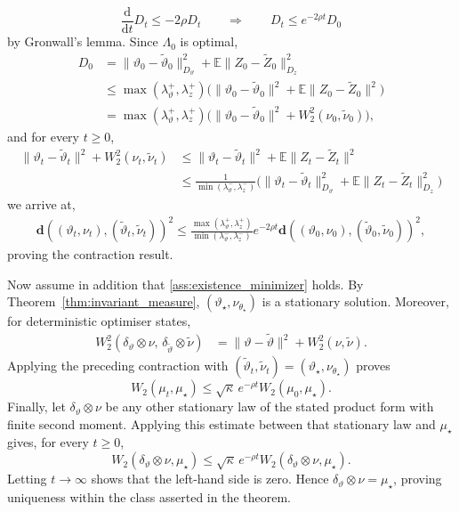 \[
    \frac{\mathrm d}{\mathrm dt}D_t
    \le
    -2\rho D_t\qquad\Rightarrow\qquad D_t\le e^{-2\rho t}D_0
\]
by Gronwall's lemma. Since \(\Lambda_0\) is optimal,
\begin{align*}
    D_0
    &=
    \|\vartheta_0-\tilde\vartheta_0\|_{D_\vartheta}^2
    + \mathbb E\|Z_0-\tilde Z_0\|_{D_z}^2\\
    &\le \max(\lambda_\vartheta^+,\lambda_z^+)\big(\|\vartheta_0-\tilde\vartheta_0\|^2
    + \mathbb E\|Z_0-\tilde Z_0\|^2\big)
    \\
    &= \max(\lambda_\vartheta^+,\lambda_z^+)\big(\|\vartheta_0-\tilde\vartheta_0\|^2
    +W_2^2(\nu_0,\tilde\nu_0)\big),
\end{align*}
and for every \(t\ge0\),
\begin{align*}
    \|\vartheta_t-\tilde\vartheta_t\|^2 +W_2^2(\nu_t,\tilde\nu_t)
    &\le
    \|\vartheta_t-\tilde\vartheta_t\|^2+\mathbb E\|Z_t-\tilde Z_t\|^2\\
    &\le\frac{1}{\min(\lambda^-_\vartheta,\lambda^-_z)}\big(\|\vartheta_t-\tilde\vartheta_t\|^2_{D_\vartheta}+\mathbb E\|Z_t-\tilde Z_t\|_{D_z}^2\big)
\end{align*}
we arrive at,
\begin{align*}
    \mathbf{d}((\vartheta_t,\nu_t),(\tilde{\vartheta}_t,\tilde{\nu}_t))^2
    \le
    \frac{\max(\lambda_\vartheta^+,\lambda_z^+)}{\min(\lambda^-_\vartheta,\lambda^-_z)}e^{-2\rho t}
    \mathbf{d}((\vartheta_0,\nu_0),(\tilde{\vartheta}_0,\tilde{\nu}_0))^2,
\end{align*}
proving the contraction result.

Now assume in addition that \ref{ass:existence_minimizer} holds.
By Theorem~\ref{thm:invariant_measure},
\((\vartheta_\star,\nu_{\theta_\star})\) is a stationary solution. Moreover,
for deterministic optimiser states,
\[
\begin{aligned}
W_2^2\!\left(
\delta_\vartheta\otimes\nu,\,
\delta_{\tilde\vartheta}\otimes\tilde\nu
\right)
&=
\|\vartheta-\tilde\vartheta\|^2
+
W_2^2(\nu,\tilde\nu).
\end{aligned}
\]
Applying the preceding contraction with
\((\tilde\vartheta_t,\tilde\nu_t)
=(\vartheta_\star,\nu_{\theta_\star})\) proves
\[
W_2(\mu_t,\mu_\star)
\leq
\sqrt\kappa\,e^{-\rho t}W_2(\mu_0,\mu_\star).
\]
Finally, let \(\delta_\vartheta\otimes\nu\) be any other stationary law of
the stated product form with finite second moment. Applying this estimate
between that stationary law and \(\mu_\star\) gives, for every \(t\geq0\),
\[
W_2(\delta_\vartheta\otimes\nu,\mu_\star)
\leq
\sqrt\kappa\,e^{-\rho t}
W_2(\delta_\vartheta\otimes\nu,\mu_\star).
\]
Letting \(t\to\infty\) shows that the left-hand side is zero. Hence
\(\delta_\vartheta\otimes\nu=\mu_\star\), proving uniqueness within the class asserted in the theorem.

